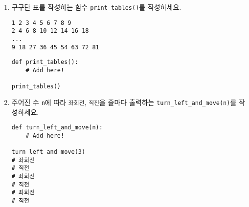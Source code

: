 \documentclass[../main.tex]{subfiles}
\begin{document}
\begin{enumerate}
\item 구구단 표를 작성하는 함수 \verb|print_tables()|를 작성하세요.
\begin{verbatim}
1 2 3 4 5 6 7 8 9
2 4 6 8 10 12 14 16 18
...
9 18 27 36 45 54 63 72 81
\end{verbatim}
\begin{verbatim}
def print_tables():
    # Add here!

print_tables()
\end{verbatim}


\item 주어진 수 \verb|n|에 따라 \verb|좌회전|, \verb|직진|을 줄마다 출력하는
  \verb|turn_left_and_move(n)|를 작성하세요.
\begin{verbatim}
def turn_left_and_move(n):
    # Add here!

turn_left_and_move(3)
# 좌회전
# 직전
# 좌회전
# 직전
# 좌회전
# 직전
\end{verbatim}


%
%

%


\end{enumerate}
\end{document}
